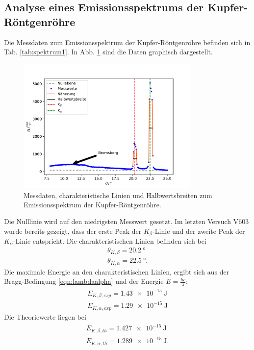 \subsection{Analyse eines Emissionsspektrums der Kupfer-Röntgenröhre}
\label{sec:emission}
Die Messdaten zum Emissionsspektrum der Kupfer-Röntgenröhre befinden sich in Tab. \ref{tab:spektrum1}.
In Abb. \ref{fig:emission} sind die Daten graphisch dargestellt.
\begin{figure}
    \centering
    \includegraphics[width=0.8\textwidth]{content/data/plot.pdf}
    \caption{Messdaten, charakteristische Linien und Halbwertsbreiten zum Emissionsspektrum der Kupfer-Röntgenröhre. \cite{numpy} \cite{matplotlib} \cite{scipy}}
    \label{fig:emission}
\end{figure}
Die Nulllinie wird auf den niedrigsten Messwert gesetzt.
Im letzten Versuch V603 wurde bereits gezeigt, dass der erste Peak der $K_\beta$-Linie und der zweite Peak der $K_\alpha$-Linie entspricht.
Die charakteristischen Linien befinden sich bei
\begin{align*}
    \theta_{K,\beta} = \SI{20.2}{\degree} \\
    \theta_{K,\alpha} = \SI{22.5}{\degree} .
\end{align*}
Die maximale Energie an den charakteristischen Linien, ergibt sich aus der Bragg-Bedingung \eqref{eqn:lambdaalpha} und der Energie $E = \frac{hc}{\lambda}$:
\begin{align*}
    E_{K,\beta, exp} = \SI{1.43e-15}{\joule} \\
    E_{K,\alpha, exp} = \SI{1.29e-15}{\joule}
\end{align*}
Die Theoriewerte \cite{energies} liegen bei
\begin{align*}
    E_{K,\beta, th} = \SI{1.427e-15}{\joule} \\
    E_{K,\alpha, th} = \SI{1.289e-15}{\joule} .
\end{align*}
